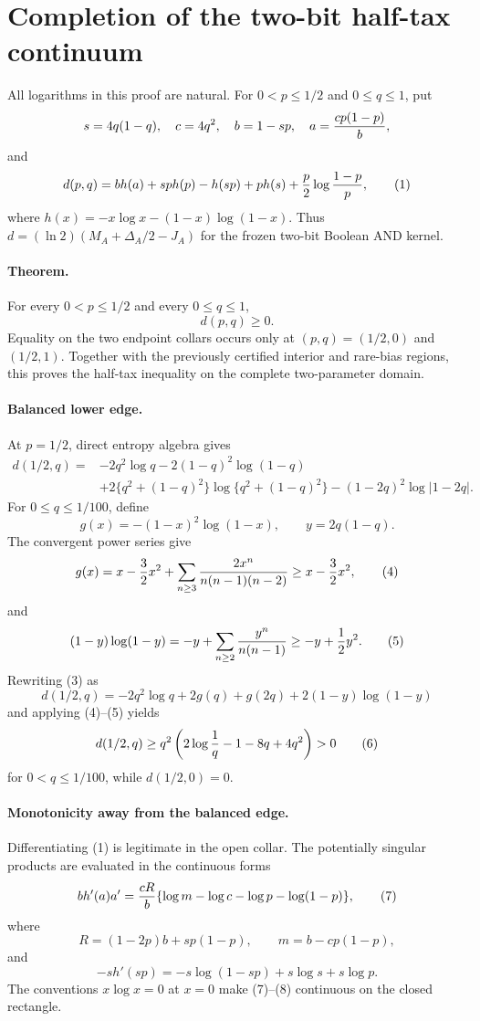 \section*{Completion of the two-bit half-tax continuum}

All logarithms in this proof are natural.  For $0<p\le1/2$ and
$0\le q\le1$, put
\[
 s=4q(1-q),\quad c=4q^2,\quad b=1-sp,\quad
 a={cp(1-p)\over b},
\]
and
\[
 d(p,q)=b h(a)+sp h(p)-h(sp)+p h(s)
          +{p\over2}\log{1-p\over p},                 \tag{1}
\]
where $h(x)=-x\log x-(1-x)\log(1-x)$.  Thus
$d=(\ln2)(M_A+\Delta_A/2-J_A)$ for the frozen two-bit Boolean AND
kernel.

\paragraph{Theorem.}
For every $0<p\le1/2$ and every $0\le q\le1$,
\[
 \boxed{d(p,q)\ge0.}                                  \tag{2}
\]
Equality on the two endpoint collars occurs only at
$(p,q)=(1/2,0)$ and $(1/2,1)$.  Together with the previously certified
interior and rare-bias regions, this proves the half-tax inequality on
the complete two-parameter domain.

\paragraph{Balanced lower edge.}
At $p=1/2$, direct entropy algebra gives
\[
 \begin{aligned}
 d(1/2,q)={}&-2q^2\log q-2(1-q)^2\log(1-q)\\
 &+2\{q^2+(1-q)^2\}\log\{q^2+(1-q)^2\}
 -(1-2q)^2\log|1-2q|.                         \tag{3}
 \end{aligned}
\]
For $0\le q\le1/100$, define
\[
 g(x)=-(1-x)^2\log(1-x),\qquad
 y=2q(1-q).
\]
The convergent power series give
\[
 g(x)=x-\frac32x^2+
 \sum_{n\ge3}{2x^n\over n(n-1)(n-2)}
 \ge x-\frac32x^2,                                   \tag{4}
\]
and
\[
 (1-y)\log(1-y)=-y+
 \sum_{n\ge2}{y^n\over n(n-1)}\ge-y+\frac12y^2.     \tag{5}
\]
Rewriting (3) as
\[
 d(1/2,q)=-2q^2\log q+2g(q)+g(2q)
                 +2(1-y)\log(1-y)
\]
and applying (4)--(5) yields
\[
 d(1/2,q)\ge q^2\left(2\log{1\over q}-1-8q+4q^2\right)>0       \tag{6}
\]
for $0<q\le1/100$, while $d(1/2,0)=0$.

\paragraph{Monotonicity away from the balanced edge.}
Differentiating (1) is legitimate in the open collar.  The potentially
singular products are evaluated in the continuous forms
\[
 b h'(a)a'={cR\over b}
  \{\log m-\log c-\log p-\log(1-p)\},                 \tag{7}
\]
where
\[
 R=(1-2p)b+sp(1-p),\qquad m=b-cp(1-p),
\]
and
\[
 -s h'(sp)=-s\log(1-sp)+s\log s+s\log p.              \tag{8}
\]
The conventions $x\log x=0$ at $x=0$ make (7)--(8) continuous on the
closed rectangle.

